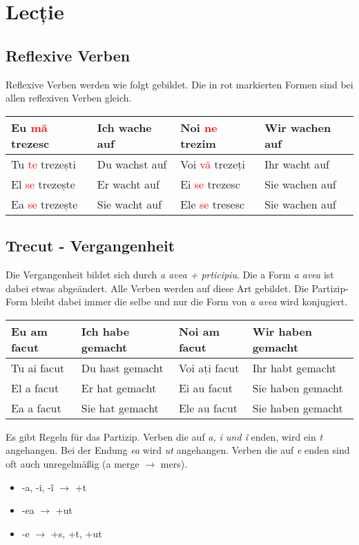 \documentclass[11pt, oneside]{article}
\begin{document}
\section{Lecție}
\subsection{Reflexive Verben}
Reflexive Verben werden wie folgt gebildet. Die in rot markierten Formen
sind bei allen reflexiven Verben gleich.
%
\begin{center}
  \begin{tabular}{ |p{3.25cm}|p{3.25cm}||p{3.25cm}|p{3.25cm}|  }
      \hline
      Eu \textcolor{Red}{mă} trezesc & Ich wache auf & Noi \textcolor{Red}{ne} trezim & Wir wachen auf\\
      \hline
      Tu \textcolor{Red}{te} trezești & Du wachst auf & Voi \textcolor{Red}{vă} trezeți & Ihr wacht auf\\
      \hline
      El \textcolor{Red}{se} trezește & Er wacht auf & Ei \textcolor{Red}{se} trezesc & Sie wachen auf\\ 
      Ea \textcolor{Red}{se} trezește & Sie wacht auf & Ele \textcolor{Red}{se} tresesc & Sie wachen auf\\
      \hline
     \end{tabular}
\end{center}
%
%
\subsection{Trecut - Vergangenheit}
Die Vergangenheit bildet sich durch \emph{a avea + prticipiu}. Die a
Form \emph{a avea} ist dabei etwas abgeändert. Alle Verben werden auf 
diese Art gebildet. Die Partizip-Form bleibt dabei immer die selbe 
und nur die Form von \emph{a avea} wird konjugiert.
%
\begin{center}
  \begin{tabular}{ |p{3.25cm}|p{3.25cm}||p{3.25cm}|p{3.25cm}|  }
      \hline
      Eu am facut & Ich habe gemacht & Noi am facut & Wir haben gemacht\\
      \hline
      Tu ai facut & Du hast gemacht & Voi ați facut & Ihr habt gemacht\\
      \hline
      El a facut & Er hat gemacht & Ei au facut & Sie haben gemacht\\ 
      Ea a facut & Sie hat gemacht& Ele au facut & Sie haben gemacht\\
      \hline
     \end{tabular}
\end{center}
%
%
Es gibt Regeln für das Partizip. Verben die auf \emph{a, i und î} enden, 
wird ein \emph{t} angehangen. Bei der Endung \emph{ea} wird \emph{ut} 
angehangen. Verben die auf \emph{e} enden sind oft auch unregelmäßig 
(a merge $\rightarrow$ mers).
\begin{itemize}
  \item -a, -i, -î $\rightarrow$ +t
  \item -ea $\rightarrow$ +ut 
  \item -e $\rightarrow$ +s, +t, +ut
\end{itemize}
\end{document}
